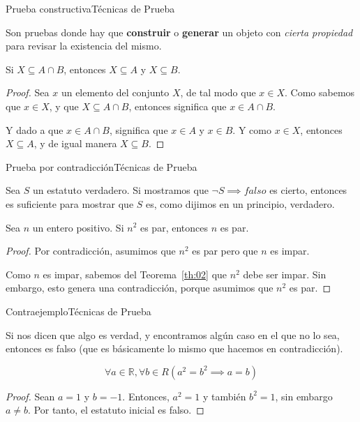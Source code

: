 \documentclass[spanish, c]{beamer}
\begin{document}
\begin{frame}{Prueba constructiva}{Técnicas de Prueba}

    Son pruebas donde hay que \textbf{construir} o \textbf{generar} un objeto con \textit{cierta propiedad} para revisar la existencia del mismo.
    
    \begin{theorem}
        Si $X \subseteq A \cap B$, entonces $X \subseteq A$ y $X \subseteq B$.
    \end{theorem}

    \begin{proof}
        Sea $x$ un elemento del conjunto $X$, de tal modo que $x \in X$.
        Como sabemos que $x \in X$, y que $X \subseteq A \cap B$, entonces significa que $x \in A \cap B$.

        Y dado a que $x \in A \cap B$, significa que $x \in A$ y $x \in B$.
        Y como $x \in X$, entonces $X \subseteq A$, y de igual manera $X \subseteq B$.
    \end{proof}

\end{frame}

\begin{frame}{Prueba por contradicción}{Técnicas de Prueba}

    Sea $S$ un estatuto verdadero. Si mostramos que $\neg S \implies falso$ es cierto, entonces es suficiente para mostrar que $S$ es, como dijimos en un principio, verdadero. \pause

    \begin{theorem}
        Sea $n$ un entero positivo. Si $n^2$ es par, entonces $n$ es par.
    \end{theorem}

    \begin{proof}
        Por contradicción, asumimos que $n^2$ es par pero que $n$ es impar.
        
        Como $n$ es impar, sabemos del Teorema~\ref{th:02} que $n^2$ debe ser impar. Sin embargo, esto genera una contradicción, porque asumimos que $n^2$ es par.
    \end{proof}

\end{frame}

\begin{frame}{Contraejemplo}{Técnicas de Prueba}

    Si nos dicen que algo es verdad, y encontramos algún caso en el que no lo sea, entonces es falso (que es básicamente lo mismo que hacemos en contradicción). \pause

    $$\forall a \in \mathbb{R}, \forall b \in {R} (a^2 = b^2 \implies a = b)$$ \pause

    \bigskip

    \begin{proof}
        Sean $a = 1$ y $b = -1$. Entonces, $a^2 = 1$ y también $b^2 = 1$, sin embargo $a \neq b$. Por tanto, el estatuto inicial es falso.
    \end{proof}

\end{frame}
\end{document}
